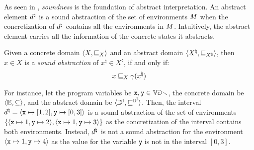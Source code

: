 \begin{description}
    As seen in , \emph{soundness} is the foundation of abstract interpretation. An abstract element $d^\natural$ is a sound abstraction of the set of environments $M$ when the concretization of $d^\natural$ contains all the environments in $M$. Intuitively, the abstract element carries all the information of the concrete states it abstracts.
    \begin{definition}
      Given a concrete domain $\langle X, \sqsubseteq_X \rangle$ and an abstract domain $\langle X^\natural, \sqsubseteq_{X^\natural} \rangle$, then $x\in X$ is a \emph{sound abstraction} of $x^\natural\in X^\natural$, if and only if:
    \begin{align*}
      x \sqsubseteq_X \gamma(x^\natural)
    \end{align*}
    \end{definition}
    For instance, let the program variables be $\textup{\texttt{x}}, \texttt{y} \in \mathbb{Var}$, the concrete domain be $\langle \mathbb{E}, \subseteq \rangle$, and the abstract domain be $\langle \mathbb{D}^{\mathbb{I}}, \sqsubseteq^{\mathbb{D}^{\mathbb{I}}} \rangle$.
    Then, the interval $d^\natural = \langle \textup{\texttt{x}} \mapsto [1, 2], \texttt{y} \mapsto [0, 3] \rangle$ is a sound abstraction of the set of environments $\{\langle \textup{\texttt{x}}\mapsto 1, \texttt{y}\mapsto 2 \rangle, \langle \textup{\texttt{x}}\mapsto 1, \texttt{y}\mapsto 3 \rangle\}$ as the concretization of the interval contains both environments. Instead, $d^\natural$ is not a sound abstraction for the environment $\langle \textup{\texttt{x}}\mapsto 1, \texttt{y}\mapsto 4 \rangle$ as the value for the variable \texttt{y} is not in the interval $[0, 3]$.


\end{description}
